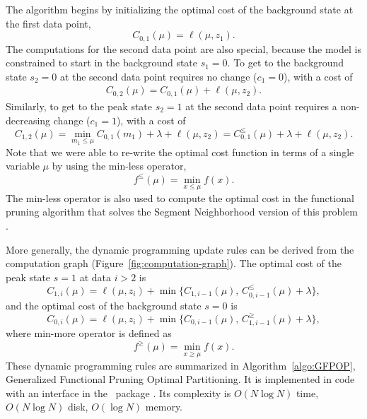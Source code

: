 \documentclass[article]{jss}
\newcommand{\R}{\proglang{R}}
\begin{document}
The algorithm begins by initializing the optimal cost of the
background state at the first data point,
\begin{equation}
  \label{eq:init_1}
  C_{0,1}(\mu)=\ell(\mu, z_1).
\end{equation}
The computations for the second data point are also special, because
the model is constrained to start in the background state $s_1=0$. To
get to the background state $s_2=0$ at the second data point requires no
change ($c_1=0$), with a cost of
\begin{eqnarray}
  C_{0,2}(\mu)=C_{0,1}(\mu)+\ell(\mu, z_2).
\end{eqnarray}
Similarly, to get to the peak state $s_2=1$ at the second data point
requires a non-decreasing change ($c_1=1$), with a cost of
\begin{equation}
  \label{eq:C_12}
  C_{1,2}(\mu)=\min_{m_1\leq\mu} C_{0,1}(m_1)+\lambda + \ell(\mu, z_2)=C_{0,1}^\leq(\mu)+\lambda+\ell(\mu, z_2).
\end{equation}
Note that we were able to re-write the optimal cost function in terms
of a single variable $\mu$ by using the min-less operator,
\begin{equation}
  \label{eq:min-less}
  f^\leq(\mu) = \min_{x\leq\mu} f(x).
\end{equation}
The min-less operator is also used to compute the optimal cost in the
functional pruning algorithm that solves the Segment Neighborhood
version of this problem
\citep{Hocking-constrained-changepoint-detection}. 

More generally, the dynamic programming update rules can be derived
from the computation graph (Figure~\ref{fig:computation-graph}). The
optimal cost of the peak state $s=1$ at data $i>2$ is
\begin{equation}
  \label{eq:dp-over}
   C_{1,i}(\mu) = \ell(\mu, z_i) + \min\{
   C_{1,i-1}(\mu),\, 
   C_{0,i-1}^\leq(\mu)+\lambda
\},
\end{equation}
and the optimal cost of the background state $s=0$ is
\begin{equation}
  \label{eq:dp-under}
     C_{0,i}(\mu) = \ell(\mu, z_i) + \min\{
   C_{0,i-1}(\mu),\, 
   C_{1,i-1}^\geq(\mu)+\lambda
\},
\end{equation}
where min-more operator is defined as
\begin{equation}
  \label{eq:min-more}
  f^\geq(\mu) = \min_{x\geq\mu} f(x).
\end{equation}
These dynamic programming rules are summarized in
Algorithm~\ref{algo:GFPOP}, Generalized Functional Pruning Optimal
Partitioning. It is implemented in  code with an
interface in the \R\ package . Its complexity is
$O(N\log N)$ time, $O(N\log N)$ disk, $O(\log N)$ memory.
\end{document}
